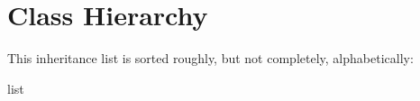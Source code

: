\section{Class Hierarchy}
This inheritance list is sorted roughly, but not completely, alphabetically\+:\begin{DoxyCompactList}
\item {}
\item {}
\item list\begin{DoxyCompactList}
\item {}
\end{DoxyCompactList}
\item {}
\item {}
\end{DoxyCompactList}
